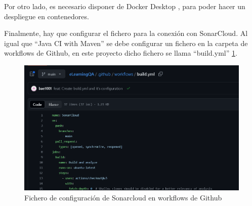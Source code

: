 Por otro lado, es necesario disponer de Docker Desktop \cite{docker}, para poder hacer un despliegue en contenedores.

Finalmente, hay que configurar el fichero para la conexión con SonarCloud. Al igual que ``Java CI with Maven'' se debe configurar un fichero en la carpeta de workflows de Github, en este proyecto dicho fichero se llama ``build.yml'' \ref{fig:sonar-workflow}.
\begin{figure}[H]
    \centering
    \includegraphics[width=1\linewidth]{img/sonar-workflow.png}
    \caption{Fichero de configuración de Sonarcloud en workflows de Github}
    \label{fig:sonar-workflow}
\end{figure}

